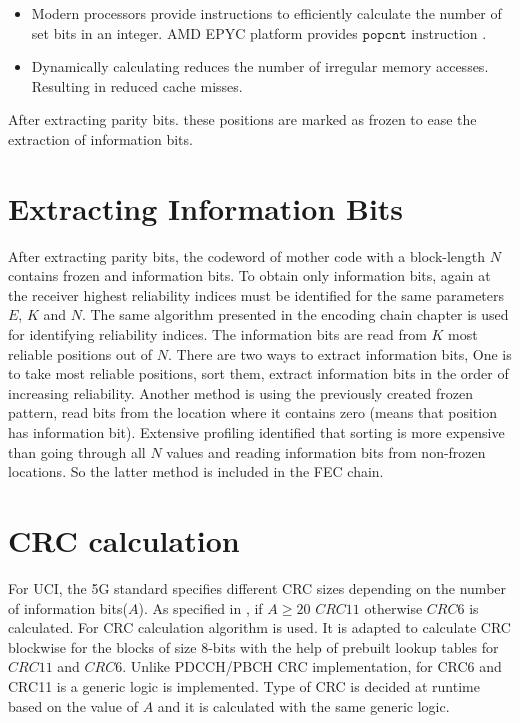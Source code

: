 \begin{itemize}  
	\item Modern processors provide instructions to efficiently calculate the number of set bits in an integer. AMD EPYC platform provides $\mathtt{popcnt}$ instruction \cite{AgnerFog}.
	\item Dynamically calculating reduces the number of irregular memory accesses. Resulting in reduced cache misses.
\end{itemize}

After extracting parity bits. these positions are marked as frozen to ease the extraction of information bits.

\section{Extracting Information Bits}
After extracting parity bits, the codeword of mother code with a block-length $N$ contains frozen and information bits. To obtain only information bits, again at the receiver highest reliability indices must be identified for the same parameters $E$, $K$ and $N$. The same algorithm presented in the encoding chain chapter is used for identifying reliability indices. The information bits are read from $K$ most reliable positions out of $N$. There are two ways to extract information bits, One is to take most reliable positions, sort them, extract information bits in the order of increasing reliability. Another method is using the previously created frozen pattern, read bits from the location where it contains zero (means that position has information bit). Extensive profiling identified that sorting is more expensive than going through all $N$ values and reading information bits from non-frozen locations. So the latter method is included in the FEC chain.

\section{CRC calculation}
For UCI, the 5G standard specifies different CRC sizes depending on the number of information bits($A$). As specified in \cite{3gpp.38.212}, if $ A \ge 20$ $ CRC11 $  otherwise $ CRC6 $ is calculated.  For CRC calculation algorithm \cite{Sarwate:1988:CCR:63030.63037} is used. It is adapted to calculate CRC blockwise for the blocks of size 8-bits with the help of prebuilt lookup tables for $ CRC11 $ and $ CRC6 $. Unlike PDCCH/PBCH CRC implementation, for CRC6 and CRC11 is a generic logic is implemented. Type of CRC is decided at runtime based on the value of $A$ and it is calculated with the same generic logic.

